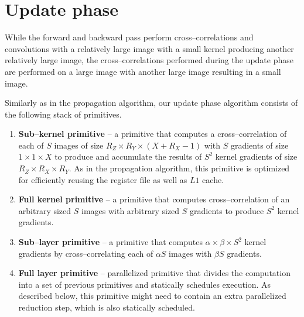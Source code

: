 \section{Update phase}

  While the forward and backward pass perform cross--correlations and
  convolutions with a relatively large image with a small kernel
  producing another relatively large image, the cross--correlations
  performed during the update phase are performed on a large image
  with another large image resulting in a small image.

  Similarly as in the propagation algorithm, our update phase algorithm
  consists of the following stack of primitives.

  \begin{enumerate}
    \item {\bf Sub--kernel primitive} -- a primitive that computes a
      cross--correlation of each of $S$ images of size $R_Z \times R_Y
      \times (X + R_X - 1)$ with $S$ gradients of size $1 \times 1
      \times X$ to produce and accumulate the results of $S^2$ kernel
      gradients of size $R_Z \times R_X \times R_Y$.  As in the
      propagation algorithm, this primitive is optimized for efficiently
      reusing the register file as well as $L1$ cache.
    \item {\bf Full kernel primitive} -- a primitive that computes
      cross--correlation of an arbitrary sized $S$ images with
      arbitrary sized $S$ gradients to produce $S^2$ kernel gradients.
    \item {\bf Sub--layer primitive} -- a primitive that computes
      $\alpha \times \beta \times S^2$ kernel gradients by
      cross--correlating each of $\alpha S$ images with $\beta S$
      gradients.
    \item {\bf Full layer primitive} -- parallelized primitive that
      divides the computation into a set of previous primitives and
      statically schedules execution.  As described below, this
      primitive might need to contain an extra parallelized reduction
      step, which is also statically scheduled.
  \end{enumerate}


